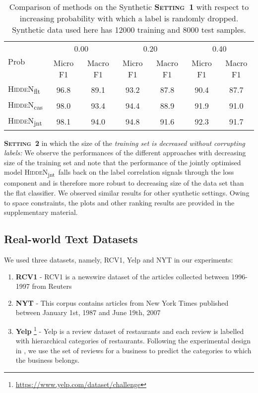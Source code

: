 \documentclass[11pt,a4paper]{article}
\newcommand{\modeljnt}{\mbox{\textsc{HiddeN}\textsubscript{jnt}}}
\newcommand{\modelcas}{\mbox{\textsc{HiddeN}\textsubscript{cas}}}
\newcommand{\modelflt}{\mbox{\textsc{HiddeN}\textsubscript{flt}}}
\begin{document}
\begin{table}
\caption{Comparison of methods on the Synthetic {\bf \mbox{\textsc{Setting 1}}} 
with respect to increasing probability with which a label is randomly dropped. Synthetic data used here has 12000 training and 8000 test samples.}
\label{tab:syn1}
\begin{adjustbox}{max width=0.48\textwidth}
\begin{tabular}{l|cc|cc|cc}
\hline
\multirow{2}{*}{Prob} & \multicolumn{2}{c|}{0.00} & \multicolumn{2}{c|}{0.20} & \multicolumn{2}{c}{0.40} \\ \cline{2-7} 
 & Micro F1 & Macro F1 & Micro F1 & Macro F1 & Micro F1 & Macro F1 \\ \hline
\modelflt & 96.8 & 89.1 & 93.2 & 87.8 & 90.4 & 87.7 \\
\modelcas & 98.0 & 93.4 & 94.4 & 88.9 & 91.9 & 91.0 \\
\modeljnt & 98.1 & 94.0 & 94.8 & 91.6 & 92.3 & 91.7 \\
\hline
\end{tabular}
\label{tab:synth1}
\end{adjustbox}
\end{table}

{\bf \mbox{\textsc{Setting 2}}} in which the size of the {\em training set is decreased without corrupting labels:} 
We observe the performances of the different approaches with decreasing size of the training set and note that the performance of the jointly optimised model \modeljnt\ falls back on the label correlation signals through the loss component  and is therefore more robust to decreasing size of the data set than the flat classifier. We observed similar results for other synthetic settings. Owing to space constraints, the plots and other ranking results are provided in the supplementary material.

\subsection{Real-world Text Datasets}
We used three datasets, namely, RCV1, Yelp and NYT in our experiments:
\begin{enumerate}[label=(\arabic*),topsep=0pt,itemsep=-1ex,partopsep=1ex,parsep=1ex,leftmargin=*]
\item \textbf{RCV1} \citep{rcv1} - RCV1 is a newswire dataset of the articles collected between 1996-1997 from Reuters
\item \textbf{NYT} \citep{nytimes} - This corpus contains articles from New York Times published between January 1st, 1987 and June 19th, 2007
\item \textbf{Yelp} \footnote{\url{https://www.yelp.com/dataset/challenge}} - Yelp is a review dataset of restaurants and each review is labelled with hierarchical categories of restaurants. Following the experimental design in \citet{emnlp}, we use the set of reviews for a business to predict the categories to which the business belongs.
\end{enumerate}
\end{document}
